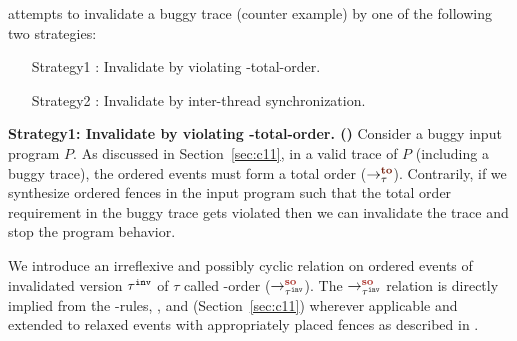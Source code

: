 \ourtechnique attempts to invalidate a buggy trace (\aka counter
example) by one of the following two strategies:
\begin{itemize}[label=strategy1,align=left,leftmargin=*]
	\item [Strategy1]:
		Invalidate by violating \sc-total-order.
	\item [Strategy2]:
		Invalidate by inter-thread synchronization.
\end{itemize}

\noindent
{\bf Strategy1: Invalidate by violating \sc-total-order. 
	(\sfence)}\newline
Consider a buggy input program $P$.
%
As discussed in Section~\ref{sec:c11}, in a valid trace of $P$ 
(including a buggy trace), 
the \sc ordered events must form a total order ($\setTO$).
%
Contrarily, if we synthesize \sc ordered fences in the input program 
such that the total order requirement in the buggy trace gets violated 
then we can invalidate the trace and stop the program behavior.

We introduce an irreflexive and possibly cyclic relation
on \sc ordered events of invalidated version ${\tau}^{\mathtt{inv}}$ of $\tau$ 
called \sc-order ($\setSO$).
%
The $\setSO$ relation is directly implied from
the \lto-rules, ,   
and  (Section~\ref{sec:c11}) wherever applicable
%
and extended to relaxed events with appropriately placed fences 
as described in \cc \cite{C11}\cite{Batty-POPL12}.


